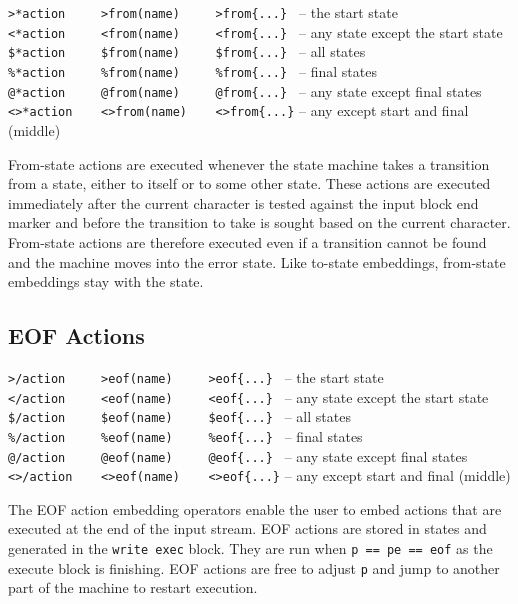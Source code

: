 \documentclass[letterpaper,11pt,oneside]{book}
\begin{document}
\sasp\verb|>*action     >from(name)     >from{...} | -- the start state\\
\sasp\verb|<*action     <from(name)     <from{...} | -- any state except the start state\\
\sasp\verb|$*action     $from(name)     $from{...} | -- all states\\
\sasp\verb|%*action     %from(name)     %from{...} | -- final states\\
\sasp\verb|@*action     @from(name)     @from{...} | -- any state except final states\\
\sasp\verb|<>*action    <>from(name)    <>from{...}| -- any except start and final (middle)
\vspace{12pt}

From-state actions are executed whenever the state machine takes a transition from a
state, either to itself or to some other state. These actions are executed
immediately after the current character is tested against the input block end
marker and before the transition to take is sought based on the current
character. From-state actions are therefore executed even if a transition
cannot be found and the machine moves into the error state.  Like to-state
embeddings, from-state embeddings stay with the state.

\subsection{EOF Actions}

\sasp\verb|>/action     >eof(name)     >eof{...} | -- the start state\\
\sasp\verb|</action     <eof(name)     <eof{...} | -- any state except the start state\\
\sasp\verb|$/action     $eof(name)     $eof{...} | -- all states\\
\sasp\verb|%/action     %eof(name)     %eof{...} | -- final states\\
\sasp\verb|@/action     @eof(name)     @eof{...} | -- any state except final states\\
\sasp\verb|<>/action    <>eof(name)    <>eof{...}| -- any except start and final (middle)
\vspace{12pt}

The EOF action embedding operators enable the user to embed actions that are
executed at the end of the input stream. EOF actions are stored in states and
generated in the \verb|write exec| block. They are run when \verb|p == pe == eof|
as the execute block is finishing. EOF actions are free to adjust \verb|p| and
jump to another part of the machine to restart execution.
\end{document}
